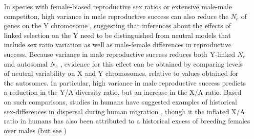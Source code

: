 \documentclass[9pt,twocolumn,twoside]{gsajnl}
\begin{document}
In species with female-biased reproductive sex ratios or extensive male-male competiton, high variance in male reproductive success can also reduce the $N_{e}$ of genes on the Y chromosome \citep{caballero1995,charlesworth2001,laporte2002,pool2007,ellegren2009}, suggesting that inferences about the effects of linked selection on the Y need to be distinguished from neutral models that include sex ratio variation as well as male-female differences in reproductive success. Because variance in male reproductive success reduces both Y-linked $N_{e}$ and autosomal $N_{e}$ \citep{kimura1964number,nomura2002effective}, evidence for this effect can be obtained by comparing levels of neutral variability on X and Y chromosomes, relative to values obtained for the autosomes. In particular, high variance in male reproductive success predicts a reduction in the Y/A diversity ratio, but an increase in the X/A ratio. Based on such comparisons, studies in humans have suggested examples of historical sex-differences in dispersal during human migration \citep{wilkins2006unraveling}, though it the inflated X/A ratio in humans has also been attributed to a historical excess of breeding females over males \citep{hammer2008sex} (but see \citep{bustamante2009,hammer2010,cotter2016genetic})
\end{document}
